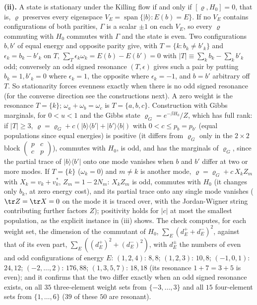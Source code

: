 \textbf{(ii).} A state is stationary under the Killing flow if and only if $[\varrho, H_0] = 0$, that is, $\varrho$ preserves every eigenspace $V_E = \operatorname{span}\{|b\rangle : E(b) = E\}$. If no $V_E$ contains configurations of both parities, $\Gamma$ is a scalar $\pm 1$ on each $V_E$, so every $\varrho$ commuting with $H_0$ commutes with $\Gamma$ and the state is even. Two configurations $b, b'$ of equal energy and opposite parity give, with $T = \{k : b_k \neq b'_k\}$ and $\epsilon_k = b_k - b'_k$ on $T$, $\sum_{T}\epsilon_k\omega_k = E(b) - E(b') = 0$ with $|T| \equiv \sum_k b_k - \sum_k b'_k$ odd; conversely an odd signed resonance $(T, \epsilon)$ gives such a pair by putting $b_k = 1, b'_k = 0$ where $\epsilon_k = 1$, the opposite where $\epsilon_k = -1$, and $b = b'$ arbitrary off $T$. So stationarity forces evenness exactly when there is no odd signed resonance (for the converse direction see the constructions next). A zero weight is the resonance $T = \{k\}$; $\omega_a + \omega_b = \omega_c$ is $T = \{a, b, c\}$. Construction with Gibbs marginals, for $0 < u < 1$ and the Gibbs state $\varrho_G = e^{-\beta H_0}/Z$, which has full rank: if $|T| \geq 3$, $\varrho = \varrho_G + c(|b\rangle\langle b'| + |b'\rangle\langle b|)$ with $0 < c \leq p_b = p_{b'}$ (equal populations since equal energies) is positive (it differs from $\varrho_G$ only in the $2 \times 2$ block $\left(\begin{smallmatrix} p & c \\ c & p\end{smallmatrix}\right)$), commutes with $H_0$, is odd, and has the marginals of $\varrho_G$, since the partial trace of $|b\rangle\langle b'|$ onto one mode vanishes when $b$ and $b'$ differ at two or more modes. If $T = \{k\}$ ($\omega_k = 0$) and $m \neq k$ is another mode, $\varrho = \varrho_G + c\,X_kZ_m$ with $X_k = v_k + v_k^{*}$, $Z_m = 1 - 2N_m$: $X_kZ_m$ is odd, commutes with $H_0$ (it changes only $b_k$, at zero energy cost), and its partial trace onto any single mode vanishes ($\tr Z = \tr X = 0$ on the mode it is traced over, with the Jordan-Wigner string contributing further factors $Z$); positivity holds for $|c|$ at most the smallest population, as the explicit instance in (iii) shows. The check computes, for each weight set, the dimension of the commutant of $H_0$, $\sum_E (d_E^{+} + d_E^{-})^{2}$, against that of its even part, $\sum_E ((d_E^{+})^{2} + (d_E^{-})^{2})$, with $d_E^{\pm}$ the numbers of even and odd configurations of energy $E$: $(1,2,4)$: $8, 8$; $(1,2,3)$: $10, 8$; $(-1,0,1)$: $24, 12$; $(-2,\ldots,2)$: $176, 88$; $(1,3,5,7)$: $18, 18$ (its resonance $1 + 7 = 3 + 5$ is even); and it confirms that the two differ exactly when an odd signed resonance exists, on all $35$ three-element weight sets from $\{-3, \ldots, 3\}$ and all $15$ four-element sets from $\{1, \ldots, 6\}$ ($39$ of these $50$ are resonant).

